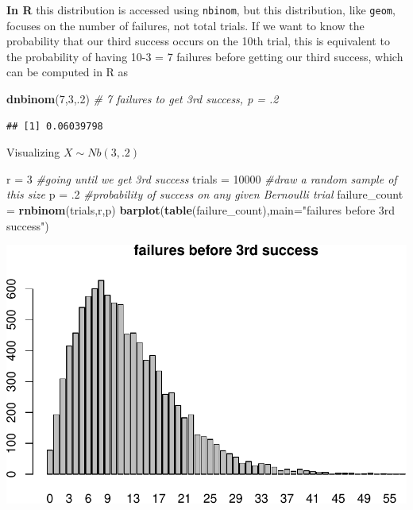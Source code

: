 \documentclass[
]{book}
\newenvironment{Shaded}{\begin{snugshade}}{\end{snugshade}}
\newcommand{\AttributeTok}[1]{\textcolor[rgb]{0.13,0.29,0.53}{#1}}
\newcommand{\CommentTok}[1]{\textcolor[rgb]{0.56,0.35,0.01}{\textit{#1}}}
\newcommand{\DecValTok}[1]{\textcolor[rgb]{0.00,0.00,0.81}{#1}}
\newcommand{\FunctionTok}[1]{\textcolor[rgb]{0.13,0.29,0.53}{\textbf{#1}}}
\newcommand{\NormalTok}[1]{#1}
\newcommand{\OtherTok}[1]{\textcolor[rgb]{0.56,0.35,0.01}{#1}}
\newcommand{\StringTok}[1]{\textcolor[rgb]{0.31,0.60,0.02}{#1}}
\theoremstyle{definition}
\theoremstyle{definition}
\theoremstyle{definition}
\theoremstyle{definition}
\theoremstyle{remark}
\begin{document}
\textbf{In R} this distribution is accessed using \texttt{nbinom}, but this distribution, like \texttt{geom}, focuses on the number of failures, not total trials. If we want to know the probability that our third success occurs on the 10th trial, this is equivalent to the probability of having 10-3 = 7 failures before getting our third success, which can be computed in R as

\begin{Shaded}
\begin{Highlighting}[]
\FunctionTok{dnbinom}\NormalTok{(}\DecValTok{7}\NormalTok{,}\DecValTok{3}\NormalTok{,.}\DecValTok{2}\NormalTok{) }\CommentTok{\# 7 failures to get 3rd success, p = .2}
\end{Highlighting}
\end{Shaded}

\begin{verbatim}
## [1] 0.06039798
\end{verbatim}

Visualizing \(X \sim Nb(3,.2)\)

\begin{Shaded}
\begin{Highlighting}[]
\NormalTok{r }\OtherTok{=} \DecValTok{3} \CommentTok{\#going until we get 3rd success}
\NormalTok{trials }\OtherTok{=} \DecValTok{10000} \CommentTok{\#draw a random sample of this size}
\NormalTok{p }\OtherTok{=}\NormalTok{ .}\DecValTok{2} \CommentTok{\#probability of success on any given Bernoulli trial}
\NormalTok{failure\_count }\OtherTok{=} \FunctionTok{rnbinom}\NormalTok{(trials,r,p)}
\FunctionTok{barplot}\NormalTok{(}\FunctionTok{table}\NormalTok{(failure\_count),}\AttributeTok{main=}\StringTok{"failures before 3rd success"}\NormalTok{)}
\end{Highlighting}
\end{Shaded}

\includegraphics{math340-notes_files/figure-latex/unnamed-chunk-158-1.pdf}
\end{document}
